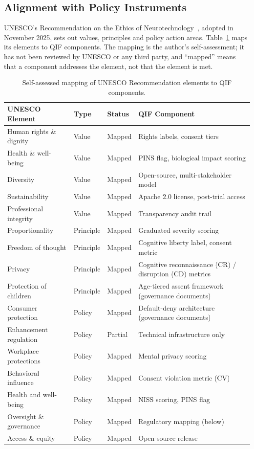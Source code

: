 \subsection{Alignment with Policy Instruments}

UNESCO's Recommendation on the Ethics of Neurotechnology~\cite{unesco2025recommendation},
adopted in November 2025, sets out values, principles and policy action areas.
Table~\ref{tab:unesco} maps its elements to QIF components. The mapping is the author's
self-assessment; it has not been reviewed by UNESCO or any third party, and ``mapped'' means
that a component addresses the element, not that the element is met.

\begin{table}[H]
\centering
\caption{Self-assessed mapping of UNESCO Recommendation elements to QIF components.}
\label{tab:unesco}
\small
\begin{tabularx}{\textwidth}{@{}l l l X@{}}
\toprule
\textbf{UNESCO Element} & \textbf{Type} & \textbf{Status} & \textbf{QIF Component} \\
\midrule
Human rights \& dignity        & Value     & Mapped  & Rights labels, consent tiers \\
Health \& well-being           & Value     & Mapped  & PINS flag, biological impact scoring \\
Diversity                      & Value     & Mapped  & Open-source, multi-stakeholder model \\
Sustainability                 & Value     & Mapped  & Apache 2.0 license, post-trial access \\
Professional integrity         & Value     & Mapped  & Transparency audit trail \\
Proportionality                & Principle & Mapped  & Graduated severity scoring \\
Freedom of thought             & Principle & Mapped  & Cognitive liberty label, consent metric \\
Privacy                        & Principle & Mapped  & Cognitive reconnaissance (CR) / disruption (CD) metrics \\
Protection of children         & Principle & Mapped  & Age-tiered assent framework (governance documents) \\
Consumer protection            & Policy    & Mapped  & Default-deny architecture (governance documents) \\
Enhancement regulation         & Policy    & Partial & Technical infrastructure only \\
Workplace protections          & Policy    & Mapped  & Mental privacy scoring \\
Behavioral influence           & Policy    & Mapped  & Consent violation metric (CV) \\
Health and well-being          & Policy    & Mapped  & NISS scoring, PINS flag \\
Oversight \& governance        & Policy    & Mapped  & Regulatory mapping (below) \\
Access \& equity               & Policy    & Mapped  & Open-source release \\
\bottomrule
\end{tabularx}
\end{table}

